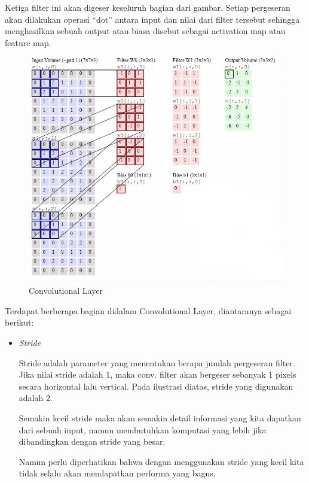 \begin{enumerate}
	Ketiga filter ini akan digeser keseluruh bagian dari gambar. Setiap pergeseran akan dilakukan operasi “dot” antara input dan nilai dari filter tersebut sehingga menghasilkan sebuah output atau biasa disebut sebagai activation map atau feature map.
	
	\begin{figure}[h]
		\centering
		
		\includegraphics[width=0.9\columnwidth]{gambar/convpool.png}
		
		\caption{Convolutional Layer\citep{cit:cnn}}
		\label{fig:convolutionallayer}
	\end{figure}

	Terdapat berberapa bagian didalam Convolutional Layer, diantaranya sebagai berikut:
	
	\begin{itemize}
		\item \textit{Stride}
		
		Stride adalah parameter yang menentukan berapa jumlah pergeseran filter. Jika nilai stride adalah 1, maka conv. filter akan bergeser sebanyak 1 pixels secara horizontal lalu vertical. Pada ilustrasi diatas, stride yang digunakan adalah 2.
		
		Semakin kecil stride maka akan semakin detail informasi yang kita dapatkan dari sebuah input, namun membutuhkan komputasi yang lebih jika dibandingkan dengan stride yang besar.
		
		Namun perlu diperhatikan bahwa dengan menggunakan stride yang kecil kita tidak selalu akan mendapatkan performa yang bagus.
		

\end{itemize}
\end{enumerate}
